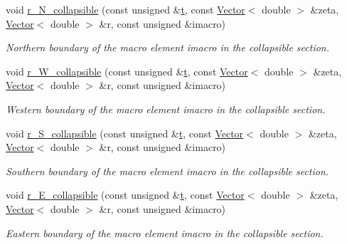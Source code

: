 \begin{DoxyCompactItemize}
void \hyperlink{classoomph_1_1CollapsibleChannelDomain_a0044d3e848b4c643a8a30f4f00a88e8d}{r\+\_\+\+N\+\_\+collapsible} (const unsigned \&\hyperlink{cfortran_8h_af6f0bd3dc13317f895c91323c25c2b8f}{t}, const \hyperlink{classoomph_1_1Vector}{Vector}$<$ double $>$ \&zeta, \hyperlink{classoomph_1_1Vector}{Vector}$<$ double $>$ \&r, const unsigned \&imacro)
\begin{DoxyCompactList}\small\item\em Northern boundary of the macro element imacro in the collapsible section. \end{DoxyCompactList}\item 
void \hyperlink{classoomph_1_1CollapsibleChannelDomain_ab8b0f990e596b2725ca8d84f2c9750eb}{r\+\_\+\+W\+\_\+collapsible} (const unsigned \&\hyperlink{cfortran_8h_af6f0bd3dc13317f895c91323c25c2b8f}{t}, const \hyperlink{classoomph_1_1Vector}{Vector}$<$ double $>$ \&zeta, \hyperlink{classoomph_1_1Vector}{Vector}$<$ double $>$ \&r, const unsigned \&imacro)
\begin{DoxyCompactList}\small\item\em Western boundary of the macro element imacro in the collapsible section. \end{DoxyCompactList}\item 
void \hyperlink{classoomph_1_1CollapsibleChannelDomain_a1cc35b555f16401ec12854ff5a486800}{r\+\_\+\+S\+\_\+collapsible} (const unsigned \&\hyperlink{cfortran_8h_af6f0bd3dc13317f895c91323c25c2b8f}{t}, const \hyperlink{classoomph_1_1Vector}{Vector}$<$ double $>$ \&zeta, \hyperlink{classoomph_1_1Vector}{Vector}$<$ double $>$ \&r, const unsigned \&imacro)
\begin{DoxyCompactList}\small\item\em Southern boundary of the macro element imacro in the collapsible section. \end{DoxyCompactList}\item 
void \hyperlink{classoomph_1_1CollapsibleChannelDomain_af684e8e3271ed8f599a02495f794c4e8}{r\+\_\+\+E\+\_\+collapsible} (const unsigned \&\hyperlink{cfortran_8h_af6f0bd3dc13317f895c91323c25c2b8f}{t}, const \hyperlink{classoomph_1_1Vector}{Vector}$<$ double $>$ \&zeta, \hyperlink{classoomph_1_1Vector}{Vector}$<$ double $>$ \&r, const unsigned \&imacro)
\begin{DoxyCompactList}\small\item\em Eastern boundary of the macro element imacro in the collapsible section. \end{DoxyCompactList}\end{DoxyCompactItemize}
